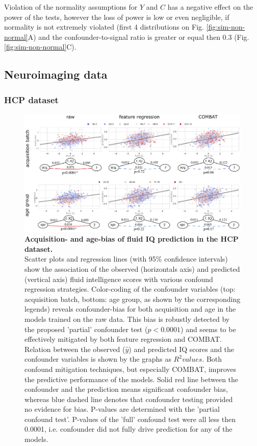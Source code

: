 \documentclass{article}
\begin{document}
Violation of the normality assumptions for $Y$ and $C$ has a negative effect on the power of the tests, however the loss of power is low or even negligible, if normality is not extremely violated (first 4 distributions on Fig. \ref{fig:sim-non-normal}A) and the confounder-to-signal ratio is greater or equal then 0.3 (Fig. \ref{fig:sim-non-normal}C).

\subsection{Neuroimaging data}
\subsubsection*{HCP dataset}

\begin{figure}[!b]
  \centering
  \includegraphics[width=0.75\paperwidth]{fig/fig_hcp.eps}
  \caption{\textbf{Acquisition- and age-bias of fluid IQ prediction in the HCP dataset.} \\
  Scatter plots and regression lines (with 95\% confidence intervals) show the association of the observed (horizontals axis) and predicted (vertical axis) fluid intelligence scores with various confound regression strategies. Color-coding of the confounder variables (top: acquisition batch, bottom: age group, as shown by the corresponding legends) reveals confounder-bias for both acquisition and age in the models trained on the raw data. This bias is robustly detected by the proposed 'partial' confounder test ($p<0.0001$) and seems to be effectively mitigated by both feature regression and COMBAT.
  Relation between the observed ($\hat{y}$) and predicted IQ scores and the confounder variables is shown by the graphs as $R^2 values$. Both confound mitigation techniques, but especially COMBAT, improves the predictive performance of the models.
  Solid red line between the confounder and the prediction means significant confounder bias, whereas blue dashed line denotes that confounder testing provided no evidence for bias. P-values are determined with the 'partial confound test'. P-values of the 'full' confound test were all less then 0.0001, i.e. confounder did not fully drive prediction for any of the models.
  }
  \label{fig:hcp}
\end{figure}
\end{document}
